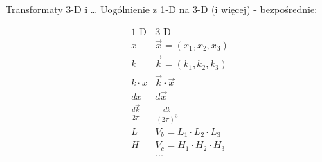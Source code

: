 \begin{frame}{Transformaty 3-D i \dots}
	Uogólnienie z 1-D na 3-D (i więcej) - bezpośrednie:
	\begin{table}[t]
		\centering
		\renewcommand{\arraystretch}{1.35}
		\[
		\tag{16.11}
		\begin{array}{c|l}
			\text{1-D} & \text{3-D} \\
			\hline
			x & \vec{x} = (x_1, x_2, x_3) \\
			k & \vec{k} = (k_1, k_2, k_3) \\
			k\cdot x & \vec{k} \cdot \vec{x} \\
			dx & d\vec{x} \\
			\frac{d\vec{k}}{2\pi} & \frac{dk}{(2\pi)^3} \\
			L & V_b = L_1 \cdot L_2 \cdot L_3 \\
			H & V_c = H_1 \cdot H_2 \cdot H_3 \\
			& \dots
		\end{array}
		\]
		\renewcommand{\arraystretch}{1}
	\end{table}
\end{frame}
